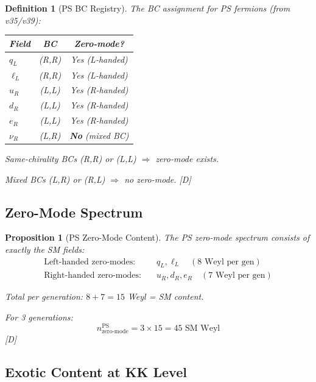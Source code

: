 \documentclass[11pt,a4paper]{article}
\newtheorem{proposition}[theorem]{Proposition}
\newtheorem{definition}[theorem]{Definition}
\newcommand{\tagD}{\textcolor{blue!70!black}{[D]}}
\begin{document}
\begin{definition}[PS BC Registry]
\label{def:ps-bc}
The BC assignment for PS fermions (from v35/v39):
\begin{center}
\begin{tabular}{lcc}
\toprule
Field & BC & Zero-mode? \\
\midrule
$q_L$ & (R,R) & Yes (L-handed) \\
$\ell_L$ & (R,R) & Yes (L-handed) \\
$u_R$ & (L,L) & Yes (R-handed) \\
$d_R$ & (L,L) & Yes (R-handed) \\
$e_R$ & (L,L) & Yes (R-handed) \\
$\nu_R$ & (L,R) & \textbf{No} (mixed BC) \\
\bottomrule
\end{tabular}
\end{center}

Same-chirality BCs (R,R) or (L,L) $\Rightarrow$ zero-mode exists.

Mixed BCs (L,R) or (R,L) $\Rightarrow$ no zero-mode.
\tagD
\end{definition}

\subsection{Zero-Mode Spectrum}

\begin{proposition}[PS Zero-Mode Content]
\label{prop:ps-zero-modes}
The PS zero-mode spectrum consists of exactly the SM fields:
\begin{align}
\label{eq:zero-mode-L}
\text{Left-handed zero-modes:} \quad & q_L, \ell_L \quad (8 \text{ Weyl per gen}) \\
\label{eq:zero-mode-R}
\text{Right-handed zero-modes:} \quad & u_R, d_R, e_R \quad (7 \text{ Weyl per gen})
\end{align}

Total per generation: $8 + 7 = 15$ Weyl = SM content.

For 3 generations:
\begin{equation}
\label{eq:zero-mode-total}
\boxed{n_{\text{zero-mode}}^{\text{PS}} = 3 \times 15 = 45 \text{ SM Weyl}}
\end{equation}
\tagD
\end{proposition}

\subsection{Exotic Content at KK Level}
\end{document}
